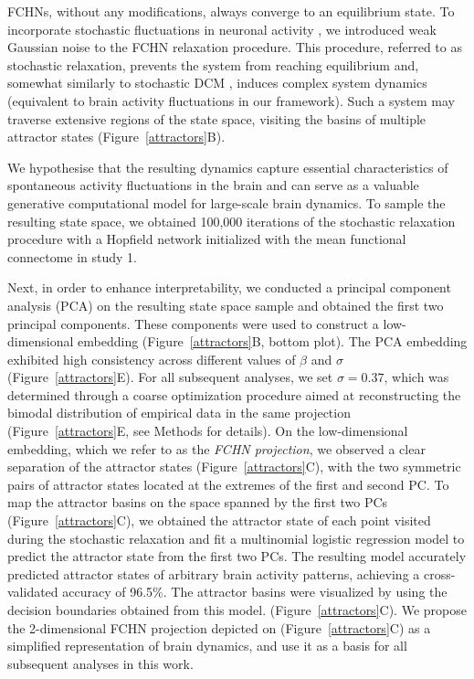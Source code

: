 \documentclass{article}
\begin{document}
FCHNs, without any modifications, always converge to an equilibrium state.
To incorporate stochastic fluctuations in neuronal activity \citep{robinson2005multiscale}, we introduced weak
Gaussian noise to the FCHN relaxation procedure. This procedure, referred to as stochastic relaxation, prevents the system from reaching equilibrium and, somewhat similarly to stochastic DCM \citep{daunizeau2012stochastic}, induces complex system dynamics (equivalent to brain activity fluctuations in our framework). Such a system may traverse extensive regions of the state space, visiting the basins of multiple attractor states (Figure~\ref{attractors}B).

We hypothesise that the resulting dynamics capture essential characteristics of spontaneous activity fluctuations in the brain and can serve as a valuable generative computational model for large-scale brain dynamics. To sample the resulting state space, we obtained 100,000 iterations of the stochastic relaxation procedure with a Hopfield network initialized with the mean functional connectome in study 1.

Next, in order to enhance interpretability, we conducted a principal component analysis (PCA) on the resulting state space sample and obtained the first two principal components.
These components were used to construct a low-dimensional embedding (Figure~\ref{attractors}B, bottom plot).
The PCA embedding exhibited high consistency across different values of $\beta$ and $\sigma$ (Figure~\ref{attractors}E).
For all subsequent analyses, we set $\sigma=0.37$, which was determined through a coarse optimization procedure aimed at reconstructing the bimodal distribution of empirical data in the same projection (Figure~\ref{attractors}E,
see Methods for details). On the low-dimensional embedding, which we refer to as the \textit{FCHN projection}, we observed a clear separation of the attractor states (Figure~\ref{attractors}C), with the two symmetric pairs of attractor states located at the extremes of the first and second PC.
To map the attractor basins on the space spanned by the first two PCs (Figure~\ref{attractors}C), we obtained the attractor state of each point visited during the stochastic relaxation and fit a multinomial logistic regression model to predict the attractor state from the first two PCs.
The resulting model accurately predicted attractor states of arbitrary brain activity patterns, achieving a cross-validated accuracy of 96.5\%.
The attractor basins were visualized by using the decision boundaries obtained from this model. (Figure~\ref{attractors}C). We propose the 2-dimensional FCHN projection depicted on (Figure~\ref{attractors}C) as a simplified representation of brain dynamics, and use it as a basis for all subsequent analyses in this work.
\end{document}
